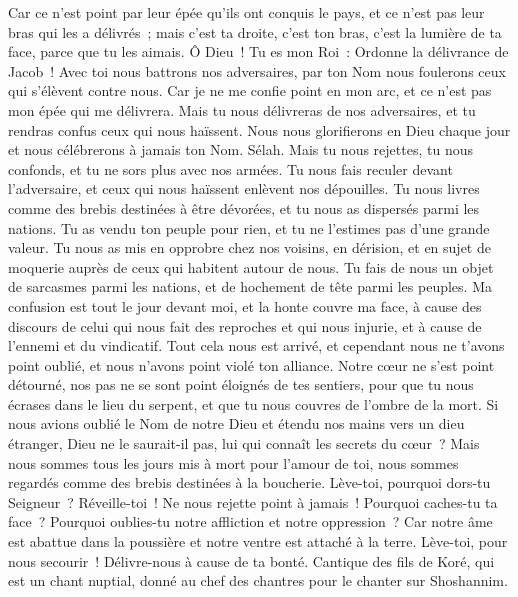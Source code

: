 \begin{multicols}{2}
Car ce n'est point par leur épée qu'ils ont conquis le pays, et ce n'est pas leur bras qui les a délivrés~; mais c'est ta droite, c'est ton bras, c'est la lumière de ta face, parce que tu les aimais.
Ô Dieu~! Tu es mon Roi~: Ordonne la délivrance de Jacob~!
Avec toi nous battrons nos adversaires, par ton Nom nous foulerons ceux qui s'élèvent contre nous.
Car je ne me confie point en mon arc, et ce n'est pas mon épée qui me délivrera.
Mais tu nous délivreras de nos adversaires, et tu rendras confus ceux qui nous haïssent.
Nous nous glorifierons en Dieu chaque jour et nous célébrerons à jamais ton Nom. Sélah.
Mais tu nous rejettes, tu nous confonds, et tu ne sors plus avec nos armées.
Tu nous fais reculer devant l'adversaire, et ceux qui nous haïssent enlèvent nos dépouilles.
Tu nous livres comme des brebis destinées à être dévorées, et tu nous as dispersés parmi les nations.
Tu as vendu ton peuple pour rien, et tu ne l'estimes pas d'une grande valeur.
Tu nous as mis en opprobre chez nos voisins, en dérision, et en sujet de moquerie auprès de ceux qui habitent autour de nous.
Tu fais de nous un objet de sarcasmes parmi les nations, et de hochement de tête parmi les peuples.
Ma confusion est tout le jour devant moi, et la honte couvre ma face,
à cause des discours de celui qui nous fait des reproches et qui nous injurie, et à cause de l'ennemi et du vindicatif.
Tout cela nous est arrivé, et cependant nous ne t'avons point oublié, et nous n'avons point violé ton alliance.
Notre cœur ne s'est point détourné, nos pas ne se sont point éloignés de tes sentiers,
pour que tu nous écrases dans le lieu du serpent, et que tu nous couvres de l'ombre de la mort.
Si nous avions oublié le Nom de notre Dieu et étendu nos mains vers un dieu étranger,
Dieu ne le saurait-il pas, lui qui connaît les secrets du cœur~?
Mais nous sommes tous les jours mis à mort pour l'amour de toi, nous sommes regardés comme des brebis destinées à la boucherie.
Lève-toi, pourquoi dors-tu Seigneur~? Réveille-toi~! Ne nous rejette point à jamais~!
Pourquoi caches-tu ta face~? Pourquoi oublies-tu notre affliction et notre oppression~?
Car notre âme est abattue dans la poussière et notre ventre est attaché à la terre.
Lève-toi, pour nous secourir~! Délivre-nous à cause de ta bonté.
\VerseOne{}Cantique des fils de Koré, qui est un chant nuptial, donné au chef des chantres pour le chanter sur Shoshannim.

\end{multicols}
